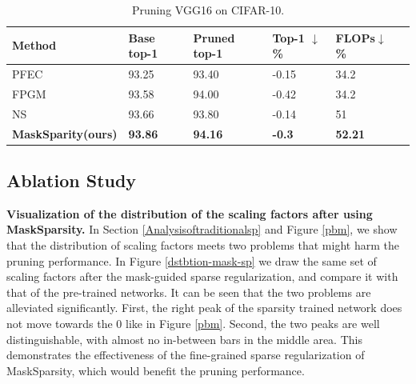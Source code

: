 \documentclass[review]{cvpr}
\begin{document}
\begin{table}[ht]
	\caption{Pruning VGG16 on CIFAR-10.}
	
	\small
	\setlength{\tabcolsep}{0.01em}
	\begin{center}
		\begin{tabular}{llllll}
			\hline
			
			Method 			&Base top-1		&Pruned top-1	& Top-1 $\downarrow$\% 	&FLOPs$\downarrow$\% \\ 
			\hline
			
			PFEC~\cite{li2016pruning}      & 93.25   & 93.40 & -0.15  &34.2\\  
			
			FPGM \cite{FPGM}   & 93.58   & 94.00  & {-0.42} &34.2\\  
			
			NS \cite{liu2017learning} & 93.66   & 93.80  &-0.14 &51\\  
			
			\textbf{MaskSparity(ours)}               &\textbf{93.86}    &\textbf{94.16} &\textbf{-0.3} & \textbf{52.21}\\
		
		    
			\hline
		
		\end{tabular}
	\end{center}
	\label{exp-table-cifar10-VGG16}
\end{table}








\subsection{Ablation Study}\label{abalation}
\textbf{Visualization of the distribution of the scaling factors after using MaskSparsity.} 
In Section \ref{Analysisoftraditionalsp} and Figure \ref{pbm}, we show that the distribution of scaling factors meets two problems that might harm the pruning performance. In Figure \ref{dstbtion-mask-sp} we draw the same set of scaling factors after the mask-guided sparse regularization, and compare it with that of the pre-trained networks. It can be seen that the two problems are alleviated significantly. First, the right peak of the sparsity trained network does not move towards the 0 like in Figure \ref{pbm}. Second, the two peaks are well distinguishable, with almost no in-between bars in the middle area. This demonstrates the effectiveness of the fine-grained sparse regularization of MaskSparsity, which would benefit the pruning performance.
  
\end{document}
